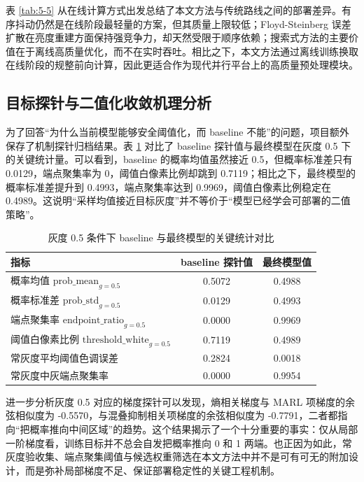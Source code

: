 \documentclass[thesis]{../zstucs-graduation-project}
\begin{document}
表 \ref{tab:5-5} 从在线计算方式出发总结了本文方法与传统路线之间的部署差异。有序抖动仍然是在线阶段最轻量的方案，但其质量上限较低；Floyd-Steinberg 误差扩散在亮度重建方面保持强竞争力，却天然受限于顺序依赖；搜索式方法的主要价值在于离线高质量优化，而不在实时吞吐。相比之下，本文方法通过离线训练换取在线阶段的规整前向计算，因此更适合作为现代并行平台上的高质量预处理模块。

\subsection{目标探针与二值化收敛机理分析}
为了回答“为什么当前模型能够安全阈值化，而 baseline 不能”的问题，项目额外保存了机制探针归档结果。表 \ref{tab:5-3} 对比了 baseline 探针值与最终模型在灰度 0.5 下的关键统计量。可以看到，baseline 的概率均值虽然接近 0.5，但概率标准差只有 0.0129，端点聚集率为 0，阈值白像素比例却跳到 0.7119；相比之下，最终模型的概率标准差提升到 0.4993，端点聚集率达到 0.9969，阈值白像素比例稳定在 0.4989。这说明“采样均值接近目标灰度”并不等价于“模型已经学会可部署的二值策略”。

\begin{table}[H]
    \centering
    \small
    \caption{灰度 0.5 条件下 baseline 与最终模型的关键统计对比}
    \label{tab:5-3}
    \begin{tabular}{lcc}
        \toprule
        指标 & baseline 探针值 & 最终模型值 \\
        \midrule
        概率均值 $\mathrm{prob\_mean}_{g=0.5}$ & 0.5072 & 0.4988 \\
        概率标准差 $\mathrm{prob\_std}_{g=0.5}$ & 0.0129 & 0.4993 \\
        端点聚集率 $\mathrm{endpoint\_ratio}_{g=0.5}$ & 0.0000 & 0.9969 \\
        阈值白像素比例 $\mathrm{threshold\_white}_{g=0.5}$ & 0.7119 & 0.4989 \\
        常灰度平均阈值色调误差 & 0.2824 & 0.0018 \\
        常灰度中灰端点聚集率 & 0.0000 & 0.9954 \\
        \bottomrule
    \end{tabular}
\end{table}

进一步分析灰度 0.5 对应的梯度探针可以发现，熵相关梯度与 MARL 项梯度的余弦相似度为 -0.5570，与混叠抑制相关项梯度的余弦相似度为 -0.7791，二者都指向“把概率推向中间区域”的趋势。这个结果揭示了一个十分重要的事实：仅从局部一阶梯度看，训练目标并不总会自发把概率推向 0 和 1 两端。也正因为如此，常灰度验收集、端点聚集阈值与候选权重筛选在本文方法中并不是可有可无的附加设计，而是弥补局部梯度不足、保证部署稳定性的关键工程机制。
\end{document}
